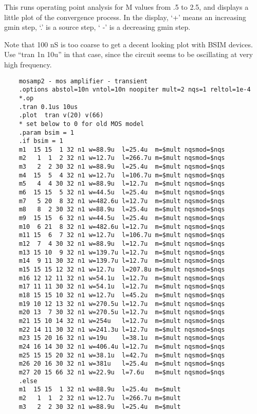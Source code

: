This runs operating point analysis for M values from .5 to 2.5, and
displays a little plot of the convergence process.  In the display,
`{\vt +}' means an increasing gmin step, `.' is a source step, `{\vt
-}' is a decreasing gmin step.

Note that 100 nS is too coarse to get a decent looking plot with BSIM
devices.  Use ``{\vt tran 1n 10u}'' in that case, since the circuit
seems to be oscillating at very high frequency.

\begin{verbatim}
    mosamp2 - mos amplifier - transient
    .options abstol=10n vntol=10n noopiter mult=2 nqs=1 reltol=1e-4
    *.op
    .tran 0.1us 10us
    .plot  tran v(20) v(66)
    * set below to 0 for old MOS model
    .param bsim = 1
    .if bsim = 1
    m1  15 15  1 32 n1 w=88.9u  l=25.4u  m=$mult nqsmod=$nqs
    m2   1  1  2 32 n1 w=12.7u  l=266.7u m=$mult nqsmod=$nqs
    m3   2  2 30 32 n1 w=88.9u  l=25.4u  m=$mult nqsmod=$nqs
    m4  15  5  4 32 n1 w=12.7u  l=106.7u m=$mult nqsmod=$nqs
    m5   4  4 30 32 n1 w=88.9u  l=12.7u  m=$mult nqsmod=$nqs
    m6  15 15  5 32 n1 w=44.5u  l=25.4u  m=$mult nqsmod=$nqs
    m7   5 20  8 32 n1 w=482.6u l=12.7u  m=$mult nqsmod=$nqs
    m8   8  2 30 32 n1 w=88.9u  l=25.4u  m=$mult nqsmod=$nqs
    m9  15 15  6 32 n1 w=44.5u  l=25.4u  m=$mult nqsmod=$nqs
    m10  6 21  8 32 n1 w=482.6u l=12.7u  m=$mult nqsmod=$nqs
    m11 15  6  7 32 n1 w=12.7u  l=106.7u m=$mult nqsmod=$nqs
    m12  7  4 30 32 n1 w=88.9u  l=12.7u  m=$mult nqsmod=$nqs
    m13 15 10  9 32 n1 w=139.7u l=12.7u  m=$mult nqsmod=$nqs
    m14  9 11 30 32 n1 w=139.7u l=12.7u  m=$mult nqsmod=$nqs
    m15 15 15 12 32 n1 w=12.7u  l=207.8u m=$mult nqsmod=$nqs
    m16 12 12 11 32 n1 w=54.1u  l=12.7u  m=$mult nqsmod=$nqs
    m17 11 11 30 32 n1 w=54.1u  l=12.7u  m=$mult nqsmod=$nqs
    m18 15 15 10 32 n1 w=12.7u  l=45.2u  m=$mult nqsmod=$nqs
    m19 10 12 13 32 n1 w=270.5u l=12.7u  m=$mult nqsmod=$nqs
    m20 13  7 30 32 n1 w=270.5u l=12.7u  m=$mult nqsmod=$nqs
    m21 15 10 14 32 n1 w=254u   l=12.7u  m=$mult nqsmod=$nqs
    m22 14 11 30 32 n1 w=241.3u l=12.7u  m=$mult nqsmod=$nqs
    m23 15 20 16 32 n1 w=19u    l=38.1u  m=$mult nqsmod=$nqs
    m24 16 14 30 32 n1 w=406.4u l=12.7u  m=$mult nqsmod=$nqs
    m25 15 15 20 32 n1 w=38.1u  l=42.7u  m=$mult nqsmod=$nqs
    m26 20 16 30 32 n1 w=381u   l=25.4u  m=$mult nqsmod=$nqs
    m27 20 15 66 32 n1 w=22.9u  l=7.6u   m=$mult nqsmod=$nqs
    .else
    m1  15 15  1 32 n1 w=88.9u  l=25.4u  m=$mult
    m2   1  1  2 32 n1 w=12.7u  l=266.7u m=$mult
    m3   2  2 30 32 n1 w=88.9u  l=25.4u  m=$mult

\end{verbatim}
